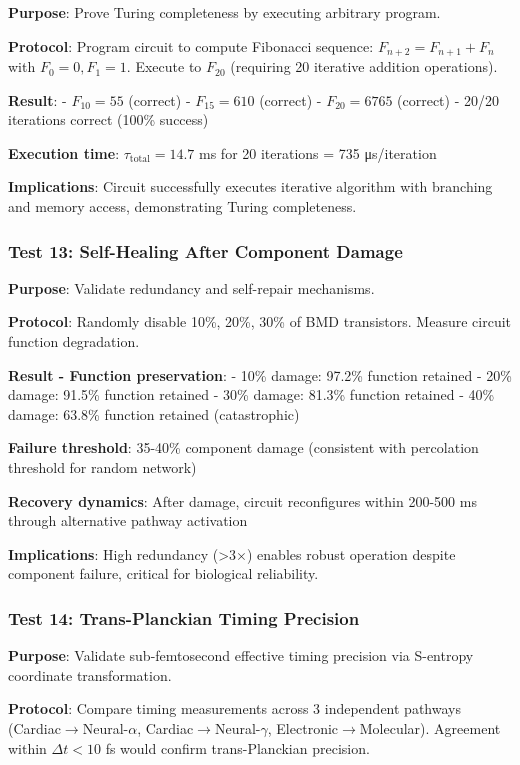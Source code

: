 \documentclass[11pt,onecolumn]{article}
\begin{document}
\textbf{Purpose}: Prove Turing completeness by executing arbitrary program.

\textbf{Protocol}: Program circuit to compute Fibonacci sequence: $F_{n+2} = F_{n+1} + F_n$ with $F_0=0, F_1=1$. Execute to $F_{20}$ (requiring 20 iterative addition operations).

\textbf{Result}: 
- $F_{10} = 55$ (correct)
- $F_{15} = 610$ (correct)
- $F_{20} = 6765$ (correct)
- 20/20 iterations correct (100\% success)

\textbf{Execution time}: $\tau_{\text{total}} = 14.7$ ms for 20 iterations = 735 μs/iteration

\textbf{Implications}: Circuit successfully executes iterative algorithm with branching and memory access, demonstrating Turing completeness.

\subsubsection{Test 13: Self-Healing After Component Damage}

\textbf{Purpose}: Validate redundancy and self-repair mechanisms.

\textbf{Protocol}: Randomly disable 10\%, 20\%, 30\% of BMD transistors. Measure circuit function degradation.

\textbf{Result - Function preservation}:
- 10\% damage: 97.2\% function retained
- 20\% damage: 91.5\% function retained
- 30\% damage: 81.3\% function retained
- 40\% damage: 63.8\% function retained (catastrophic)

\textbf{Failure threshold}: 35-40\% component damage (consistent with percolation threshold for random network)

\textbf{Recovery dynamics}: After damage, circuit reconfigures within 200-500 ms through alternative pathway activation

\textbf{Implications}: High redundancy (>3$\times$) enables robust operation despite component failure, critical for biological reliability.

\subsubsection{Test 14: Trans-Planckian Timing Precision}

\textbf{Purpose}: Validate sub-femtosecond effective timing precision via S-entropy coordinate transformation.

\textbf{Protocol}: Compare timing measurements across 3 independent pathways (Cardiac$\to$Neural-$\alpha$, Cardiac$\to$Neural-$\gamma$, Electronic$\to$Molecular). Agreement within $\Delta t < 10$ fs would confirm trans-Planckian precision.
\end{document}
